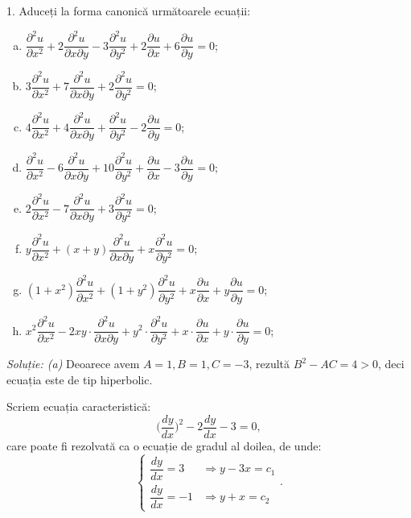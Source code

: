 1. Aduceți la forma canonică următoarele ecuații:
\begin{enumerate}[(a)]
\item $ \dfrac{\partial^2 u}{\partial x^2} + 2 \dfrac{\partial^2 u}{\partial x \partial y} - %
  3 \dfrac{\partial^2 u}{\partial y^2} + 2 \dfrac{\partial u}{\partial x} + %
  6 \dfrac{\partial u}{\partial y} = 0 $;
\item $ 3 \dfrac{\partial^2 u}{\partial x^2} + 7 \dfrac{\partial^2 u}{\partial x\partial y} + %
  2 \dfrac{\partial^2 u}{\partial y^2} = 0 $;
\item $ 4 \dfrac{\partial^2 u}{\partial x^2} + 4 \dfrac{\partial^2 u}{\partial x \partial y} + %
  \dfrac{\partial^2 u}{\partial y^2} - 2 \dfrac{\partial u}{\partial y} = 0 $;
\item $ \dfrac{\partial^2 u}{\partial x^2} - 6 \dfrac{\partial^2 u}{\partial x\partial y} + %
  10 \dfrac{\partial^2 u}{\partial y^2} + \dfrac{\partial u}{\partial x} - %
  3 \dfrac{\partial u}{\partial y} = 0 $;
\item $ 2 \dfrac{\partial^2 u}{\partial x^2} - 7 \dfrac{\partial^2 u}{\partial x \partial y} + %
  3 \dfrac{\partial^2 u}{\partial y^2} = 0 $;
\item $ y \dfrac{\partial^2 u}{\partial x^2} + (x + y) \dfrac{\partial^2 u}{\partial x \partial y} + %
  x \dfrac{\partial^2 u}{\partial y^2} = 0 $;
\item $ (1 + x^2) \dfrac{\partial^2 u}{\partial x^2} + %
  (1 + y^2) \dfrac{\partial^2 u}{\partial y^2} + %
  x \dfrac{\partial u}{\partial x} + y \dfrac{\partial u}{\partial y} = 0 $;
\item $ x^2 \dfrac{\partial^2 u}{\partial x^2} - %
  2xy \cdot \dfrac{\partial^2 u}{\partial x \partial y} + %
  y^2 \cdot \dfrac{\partial^2 u}{\partial y^2} + %
  x \cdot \dfrac{\partial u}{\partial x} + y \cdot \dfrac{\partial u}{\partial y} = 0 $;
\end{enumerate}

\emph{Soluție: (a)} Deoarece avem $ A = 1, B = 1, C = -3 $, rezultă $ B^2 - AC = 4 > 0 $,
deci ecuația este de tip hiperbolic.

Scriem ecuația caracteristică:
\[
  \Big( \dfrac{dy}{dx} \Big)^2 - 2 \dfrac{dy}{dx} - 3 = 0,
\]
care poate fi rezolvată ca o ecuație de gradul al doilea, de unde:
\[
  \begin{cases}
    \dfrac{dy}{dx} = 3 &\Rightarrow y - 3x = c_1 \\
    \dfrac{dy}{dx} = -1 &\Rightarrow y + x = c_2
  \end{cases}.
\]

